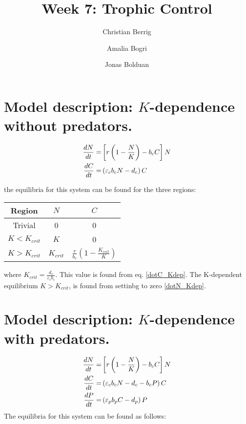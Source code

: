 \documentclass{article}
\author{Christian Berrig \and Amalia Bogri \and Jonas Bolduan}
\title{Week 7: Trophic Control}
\begin{document}
\maketitle


\section{Model description: $K$-dependence without predators.}
\begin{align}
\dv{N}{t} =& \left[ r \left(1 - \frac{N}{K} \right) - b_{c} C \right] N		\label{dotN_Kdep} \\
\dv{C}{t} =&  \left( \varepsilon_{c} b_{c} N - d_{c} \right) C			\label{dotC_Kdep}
\end{align}

the equilibria for this system can be found for the three regions:
\begin{table}[H]
\centering
\begin{tabular}{c | c c}
Region & $N$ & $C$ \\
\hline \hline
Trivial & 0 & 0 \\
$K < K_{crit}$	& $K$		& 0 \\
$K > K_{crit}$	& $K_{crit}$	& $\frac{r}{b_{c}} \left( 1 - \frac{K_{crit}}{K} \right)$ \\
\hline
\end{tabular}
\end{table}
where $K_{crit} = \frac{d_{c}}{\varepsilon_{c} b_{c}}$. This value is found from eq. \ref{dotC_Kdep}.
The K-dependent equilibrium $K > K_{crit}$, is found from settinbg to zero \ref{dotN_Kdep}.

\section{Model description: $K$-dependence with predators.}
\begin{align}
\dv{N}{t} =& \left[ r \left(1 - \frac{N}{K} \right) - b_{c} C \right] N		\label{dotN_Kdep_pred}\\
\dv{C}{t} =&  \left( \varepsilon_{c} b_{c} N - d_{c} - b_{c} P \right) C 	\label{dotC_Kdep_pred}\\
\dv{P}{t} =&  \left( \varepsilon_{p} b_{p} C - d_{p} \right) P 			\label{dotP_Kdep_pred}
\end{align}
The equilibria for this system can be found as follows:
\end{document}
